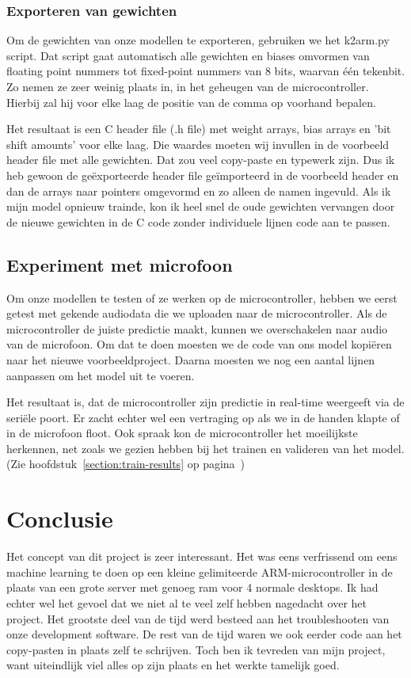 \subsubsection{Exporteren van gewichten}
Om de gewichten van onze modellen te exporteren, gebruiken we het k2arm.py script. Dat script gaat automatisch alle gewichten en biases omvormen van floating point nummers tot fixed-point nummers van 8 bits, waarvan één tekenbit. Zo nemen ze zeer weinig plaats in, in het geheugen van de microcontroller. Hierbij zal hij voor elke laag de positie van de comma op voorhand bepalen.

Het resultaat is een C header file (.h file) met weight arrays, bias arrays en 'bit shift amounts' voor elke laag. Die waardes moeten wij invullen in de voorbeeld header file met alle gewichten. Dat zou veel copy-paste en typewerk zijn. Dus ik heb gewoon de geëxporteerde header file geïmporteerd in de voorbeeld header en dan de arrays naar pointers omgevormd en zo alleen de namen ingevuld. Als ik mijn model opnieuw trainde, kon ik heel snel de oude gewichten vervangen door de nieuwe gewichten in de C code zonder individuele lijnen code aan te passen.

\subsection{Experiment met microfoon}
Om onze modellen te testen of ze werken op de microcontroller, hebben we eerst getest met gekende audiodata die we uploaden naar de microcontroller. Als de microcontroller de juiste predictie maakt, kunnen we overschakelen naar audio van de microfoon. Om dat te doen moesten we de code van ons model kopiëren naar het nieuwe voorbeeldproject. Daarna moesten we nog een aantal lijnen aanpassen om het model uit te voeren.

Het resultaat is, dat de microcontroller zijn predictie in real-time weergeeft via de seriële poort.
Er zacht echter wel een vertraging op als we in de handen klapte of in de microfoon floot. Ook spraak kon de microcontroller het moeilijkste herkennen, net zoals we gezien hebben bij het trainen en valideren van het model. (Zie hoofdstuk~\ref{section:train-results} op pagina~\pageref{section:train-results})


\section{Conclusie}
Het concept van dit project is zeer interessant. Het was eens verfrissend om eens machine learning te doen op een kleine gelimiteerde ARM-microcontroller in de plaats van een grote server met genoeg ram voor 4 normale desktops. Ik had echter wel het gevoel dat we niet al te veel zelf hebben nagedacht over het project. Het grootste deel van de tijd werd besteed aan het troubleshooten van onze development software.
De rest van de tijd waren we ook eerder code aan het copy-pasten in plaats zelf te schrijven. Toch ben ik tevreden van mijn project, want uiteindlijk viel alles op zijn plaats en het werkte tamelijk goed.
